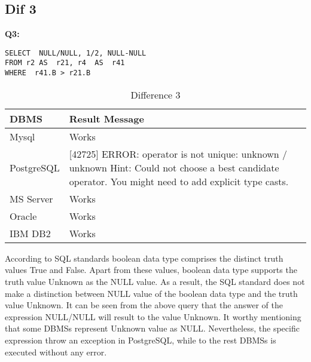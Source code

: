\hfill\newpage
\subsection{Dif 3}

\textbf{Q3:}
\begin{mdframed}[backgroundcolor=lightgray!20]
\begin{lstlisting}[style=SQL]
SELECT  NULL/NULL, 1/2, NULL-NULL
FROM r2 AS  r21, r4  AS  r41
WHERE  r41.B > r21.B 
\end{lstlisting}
\end{mdframed}

\begin{table}[h]
\centering
\caption{Difference 3}
\label{my-label}
\begin{tabular}{|p{2cm}|p{11.5cm}| }
\hline
\textbf{DBMS} & \textbf{Result Message}                                                                                                                                   \\ \hline
Mysql         & Works                                                                                                                                                     \\ \hline
PostgreSQL    & {[}42725{]} ERROR: operator is not unique: unknown / unknown Hint: Could not choose a best candidate operator. You might need to add explicit type casts. \\ \hline
MS Server     & Works                                                                                                                                                     \\ \hline
Oracle        & Works                                                                                                                                                     \\ \hline
IBM DB2       & Works                                                                                                                                                     \\ \hline
\end{tabular}
\end{table}

According to SQL standards boolean data type comprises the distinct truth values True and False. Apart from these values, boolean data type supports the truth value Unknown as the NULL value. As a result, the SQL standard does not make a distinction between NULL value of the boolean data type and the truth value Unknown. It can be seen from the above query that the answer of  the expression NULL/NULL will result to the value Unknown. It worthy mentioning that some DBMSs represent Unknown value as NULL. Nevertheless, the specific expression throw an exception in PostgreSQL, while to the rest DBMSs is executed without any error. 

